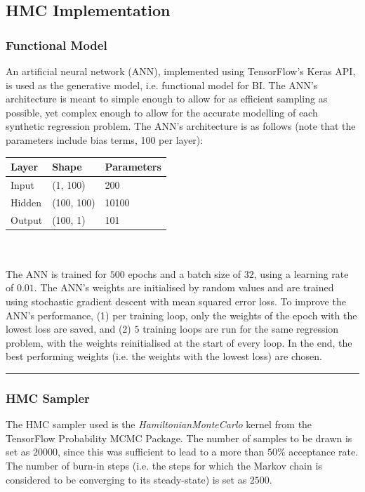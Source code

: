 \documentclass[conference]{IEEEtran}
\begin{document}
\subsection{HMC Implementation}
\subsubsection{Functional Model}
An artificial neural network (ANN), implemented using TensorFlow's Keras API, is used as the generative model, i.e. functional model for BI. The ANN's architecture is meant to simple enough to allow for as efficient sampling as possible, yet complex enough to allow for the accurate modelling of each synthetic regression problem. The ANN's architecture is as follows (note that the parameters include bias terms, 100 per layer):\\

\begin{tabular}{| m{1cm} | m{1.5cm} | m{2cm} |}
    \hline
    \textbf{Layer} & \textbf{Shape} & \textbf{Parameters}\\
    \hline
    Input & (1, 100) & 200\\
    \hline
    Hidden & (100, 100) & 10100\\
    \hline
    Output & (100, 1) & 101\\
    \hline
\end{tabular}\\~\\

The ANN is trained for $500$ epochs and a batch size of $32$, using a learning rate of $0.01$. The ANN's weights are initialised by random values and are trained using stochastic gradient descent with mean squared error loss. To improve the ANN's performance, (1) per training loop, only the weights of the epoch with the lowest loss are saved, and (2) $5$ training loops are run for the same regression problem, with the weights reinitialised at the start of every loop. In the end, the best performing weights (i.e. the weights with the lowest loss) are chosen.

\par\noindent\rule{0.49\textwidth}{0.1pt}

\subsubsection{HMC Sampler}
The HMC sampler used is the \textit{HamiltonianMonteCarlo} kernel from the TensorFlow Probability MCMC Package. The number of samples to be drawn is set as $20000$, since this was sufficient to lead to a more than $50\%$ acceptance rate. The number of burn-in steps (i.e. the steps for which the Markov chain is considered to be converging to its steady-state) is set as $2500$.\\
\end{document}
